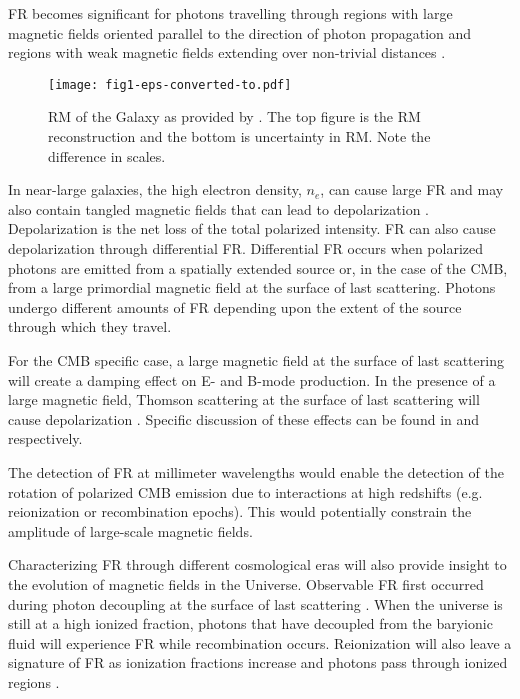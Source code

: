 \documentclass[usenatbib,hidelinks]{mnras}
\begin{document}
{ FR becomes significant for photons travelling through regions with large magnetic fields oriented parallel to the direction of photon propagation and regions with weak magnetic fields extending over non-trivial distances \citep{De:2013}.
  \begin{figure}[H!t]
 \centering
 \texttt{[image: fig1-eps-converted-to.pdf]}
 \caption{RM of the Galaxy as provided by \protect\cite{Oppermann:2014}. The top figure is the RM reconstruction and the bottom is uncertainty in RM. Note the difference in scales. \label{fig: Radio RM}	}
 \end{figure}
 
 In near-large galaxies, the high electron density, $n_{e}$, can cause large FR and may also contain tangled magnetic fields that can lead to depolarization \citep{spass:2010}. 
  Depolarization is the net loss of the 
 total polarized intensity. FR can also cause depolarization
 through differential FR. Differential FR occurs when polarized photons are emitted from a spatially extended source or, in the case of the CMB, from a large primordial magnetic field at the surface of last scattering. Photons undergo different amounts of FR depending upon the extent of the source through which they travel. 
 
For the CMB specific case, a large magnetic field at the surface of last scattering will create a damping effect on E- and B-mode production.
 In the presence of a large magnetic field, Thomson scattering at the surface of last scattering will cause depolarization \citep{scoccola:2004}.  Specific discussion of these effects can be found in \citet{harari:1997} and \citet{scoccola:2004}  respectively. 

   The detection of FR at millimeter wavelengths would enable
the detection of the rotation of polarized CMB emission due to interactions at high redshifts (e.g. reionization or recombination epochs). 
This would potentially constrain the amplitude of large-scale magnetic fields.

Characterizing FR through different cosmological eras  will also provide insight to the evolution of magnetic fields in the Universe.
  Observable FR first occurred during photon decoupling at the surface of last scattering \citep{Kosowsky:1996yc}. 
  When the universe is still at a high ionized fraction, photons that have decoupled from the baryionic fluid will experience FR while recombination occurs. Reionization will also leave a signature of FR as ionization fractions increase and photons pass through ionized regions \citep{scoccola:2004}. 
   
}
\end{document}
